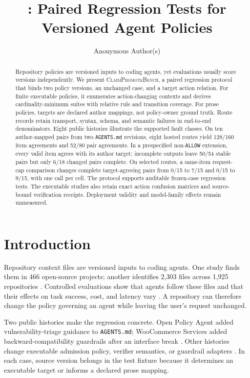 \documentclass[10pt]{article}
\title{\cpb: Paired Regression Tests for Versioned Agent Policies}
\author{Anonymous Author(s)}
\date{}
\newcommand{\cpb}{\textsc{ClaimPromoteBench}\xspace}
\newcommand{\allow}{\texttt{ALLOW}}
\begin{document}
\raggedbottom
\maketitle

\begin{abstract}
Repository policies are versioned inputs to coding agents, yet evaluations usually score versions
independently. We present \cpb, a paired regression protocol that binds two policy versions, an
unchanged case, and a target action relation. For finite executable policies, it enumerates
action-changing contexts and derives cardinality-minimum suites with relative rule and transition
coverage. For prose policies, targets are declared author mappings, not policy-owner ground truth.
Route records retain transport, syntax, schema, and semantic failures in end-to-end denominators.
Eight public histories illustrate the supported fault classes. On ten author-mapped pairs from two
\texttt{AGENTS.md} revisions, eight hosted routes yield 128/160 item agreements and 52/80 pair
agreements. In a prespecified non-\allow{} extension, every valid item agrees with its author target;
incomplete outputs leave 50/54 stable pairs but only 6/18 changed pairs complete. On selected
routes, a same-item request-cap comparison changes complete target-agreeing pairs from 0/15 to 7/15
and 0/15 to 9/15, with one call per cell. The protocol supports auditable frozen-case regression
tests. The executable studies also retain exact action confusion matrices and source-bound
verification receipts. Deployment validity and model-family effects remain unmeasured.
\end{abstract}

\section{Introduction}

Repository context files are versioned inputs to coding agents. One study finds them in 466
open-source projects; another identifies 2,303 files across 1,925 repositories
\cite{mohsenimofidi2026context,chatlatanagulchai2025agentreadmes}. Controlled evaluations show that
agents follow these files and that their effects on task success, cost, and latency vary
\cite{lulla2026agentsmd,gloaguen2026agentsmd,khatri2026contextfiles}. A repository can therefore
change the policy governing an agent while leaving the user's request unchanged.

Two public histories make the regression concrete. Open Policy Agent added vulnerability-triage
guidance to \texttt{AGENTS.md}; WooCommerce Services added backward-compatibility guardrails after
an interface break \cite{opa2026agentssecurity,woocommerce2026agentsbc}. Other histories change
executable admission policy, verifier semantics, or guardrail adapters
\cite{gatekeeper2020flexvolume,gatekeeper2021selector,aquasecurity2024trivy,sigstore2022rego,
microsoft2026agentgovernance,agentgateway2026bedrock}. In each case, source version belongs in the
test fixture because it determines an executable target or informs a declared prose mapping.
\end{document}
